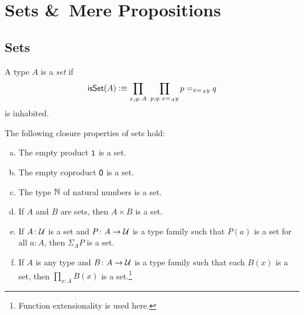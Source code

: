 \chapter{Sets \texorpdfstring{\&}{and}\ Mere Propositions}

\section{Sets}

\begin{defn}
    A type $A$ is a \textsl{set} if
    \[
        \fun{isSet}(A)\defeq\prod_{x,y\colon A}\;\prod_{p,q\colon x\eq Ay}
            p\eq{x\eq Ay}q
    \]
    is inhabited.
\end{defn}


\begin{thm}\fe\label{thm:sets}
    The following closure properties of sets hold:
    \begin{enumerate}[a),font=\upshape]
        \item The empty product\/ $\mathsf{1}$ is a set.
        \item The empty coproduct\/ $\mathsf{0}$ is a set.
        \item The type\/ $\mathbb{N}$ of natural numbers is a set.
        \item If\/ $A$ and\/ $B$ are sets, then\/ $A\times B$ is a set.
        \item If\/ $A\colon\univ$ is a set and\/ $P\colon A\to\univ$ is a type family such that\/ $P(a)$ is a set for all\/ $a\colon A$, then\/ $\Sigma_AP$ is a set.
        \item If\/ $A$ is any type and\/ $B\colon A\to\univ$ is a type family such that each\/ $B(x)$ is a set, then\/ $\prod_{x\colon A}B(x)$ is a set.\footnote{Function extensionality is used here.}
    \end{enumerate}
\end{thm}

